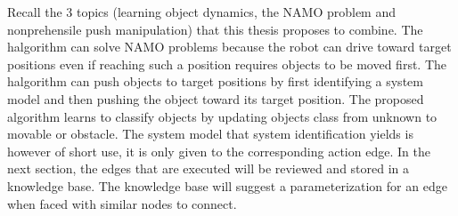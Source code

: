 Recall the 3 topics (learning object dynamics, the \ac{NAMO} problem and nonprehensile push manipulation) that this thesis proposes to combine. The \ac{halgorithm} can solve \ac{NAMO} problems because the robot can drive toward target positions even if reaching such a position requires objects to be moved first. The \ac{halgorithm} can push objects to target positions by first identifying a system model and then pushing the object toward its target position. The proposed algorithm learns to classify objects by updating objects class from unknown to movable or obstacle. The system model that system identification yields is however of short use, it is only given to the corresponding action edge. In the next section, the edges that are executed will be reviewed and stored in a knowledge base. The knowledge base will suggest a parameterization for an edge when faced with similar nodes to connect. 
